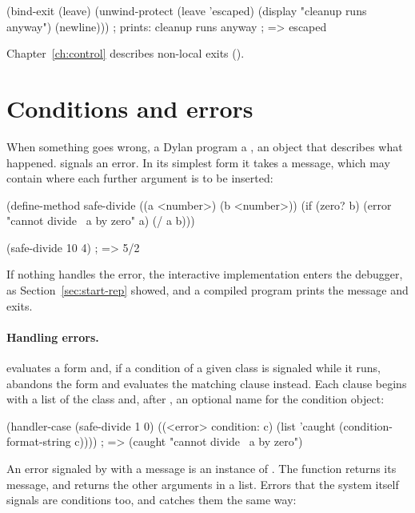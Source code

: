 \begin{dylan}
(bind-exit (leave)
  (unwind-protect
    (leave 'escaped)
    (display "cleanup runs anyway")
    (newline)))
; prints: cleanup runs anyway
; => escaped
\end{dylan}

Chapter~\ref{ch:control} describes non-local exits
().

\section{Conditions and errors}\label{sec:tut-conditions}

When something goes wrong, a Dylan program  a
, an object that describes what happened. 
signals an error. In its simplest form it takes a message, which may
contain  where each further argument is to be
inserted:

\begin{dylan}
(define-method safe-divide ((a <number>) (b <number>))
  (if (zero? b)
      (error "cannot divide ~a by zero" a)
      (/ a b)))

(safe-divide 10 4)              ; => 5/2
\end{dylan}

If nothing handles the error, the interactive implementation enters the
debugger, as Section~\ref{sec:start-rep} showed, and a compiled program
prints the message and exits.

\paragraph{Handling errors.}
 evaluates a form and, if a condition of a given class
is signaled while it runs, abandons the form and evaluates the matching
clause instead. Each clause begins with a list of the class and, after
, an optional name for the condition object:

\begin{dylan}
(handler-case (safe-divide 1 0)
  ((<error> condition: c)
   (list 'caught (condition-format-string c))))
; => (caught "cannot divide ~a by zero")
\end{dylan}

An error signaled by  with a message is an instance of
. The function 
returns its message, and  returns the
other arguments in a list. Errors that the system itself signals are
conditions too, and  catches them the same way:

